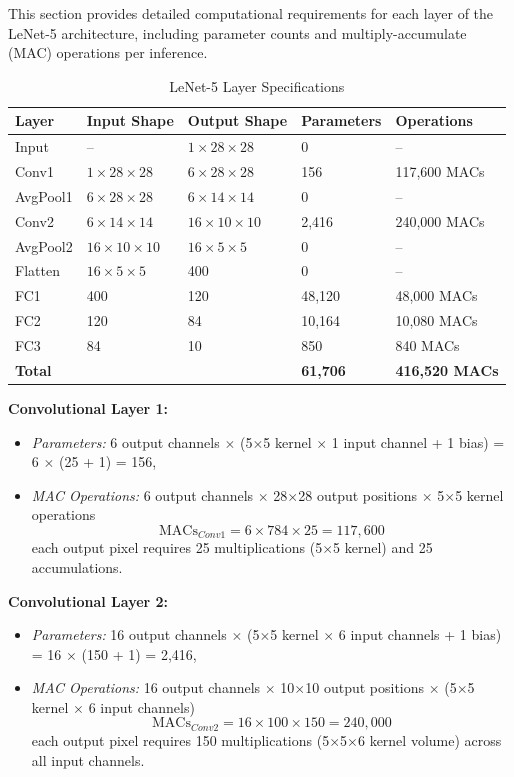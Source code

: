 \documentclass[12pt,a4paper]{report}
\begin{document}
This section provides detailed computational requirements for each layer of the LeNet-5 architecture, including parameter counts and multiply-accumulate (MAC) operations per inference.

\begin{table}[H]
\centering
\caption{LeNet-5 Layer Specifications}
\begin{tabular}{lllll}
\toprule
\textbf{Layer} & \textbf{Input Shape} & \textbf{Output Shape} & \textbf{Parameters} & \textbf{Operations} \\
\midrule
Input & -- & $1 \times 28 \times 28$ & 0 & -- \\
Conv1 & $1 \times 28 \times 28$ & $6 \times 28 \times 28$ & 156 & 117,600 MACs \\
AvgPool1 & $6 \times 28 \times 28$ & $6 \times 14 \times 14$ & 0 & -- \\
Conv2 & $6 \times 14 \times 14$ & $16 \times 10 \times 10$ & 2,416 & 240,000 MACs \\
AvgPool2 & $16 \times 10 \times 10$ & $16 \times 5 \times 5$ & 0 & -- \\
Flatten & $16 \times 5 \times 5$ & 400 & 0 & -- \\
FC1 & 400 & 120 & 48,120 & 48,000 MACs \\
FC2 & 120 & 84 & 10,164 & 10,080 MACs \\
FC3 & 84 & 10 & 850 & 840 MACs \\
\midrule
\textbf{Total} & & & \textbf{61,706} & \textbf{416,520 MACs} \\
\bottomrule
\end{tabular}
\end{table}

\textbf{Convolutional Layer 1:}
\begin{itemize}
    \item \textit{Parameters:} 6 output channels $\times$ (5$\times$5 kernel $\times$ 1 input channel + 1 bias) = 6 $\times$ (25 + 1) = 156,
    \item \textit{MAC Operations:} 6 output channels $\times$ 28$\times$28 output positions $\times$ 5$\times$5 kernel operations
    \begin{equation}
    \text{MACs}_{Conv1} = 6 \times 784 \times 25 = 117,600
    \end{equation}
    each output pixel requires 25 multiplications (5$\times$5 kernel) and 25 accumulations.
\end{itemize}

\textbf{Convolutional Layer 2:}
\begin{itemize}
    \item \textit{Parameters:} 16 output channels $\times$ (5$\times$5 kernel $\times$ 6 input channels + 1 bias) = 16 $\times$ (150 + 1) = 2,416,
    \item \textit{MAC Operations:} 16 output channels $\times$ 10$\times$10 output positions $\times$ (5$\times$5 kernel $\times$ 6 input channels)
    \begin{equation}
    \text{MACs}_{Conv2} = 16 \times 100 \times 150 = 240,000
    \end{equation}
    each output pixel requires 150 multiplications (5$\times$5$\times$6 kernel volume) across all input channels.
\end{itemize}
\end{document}
